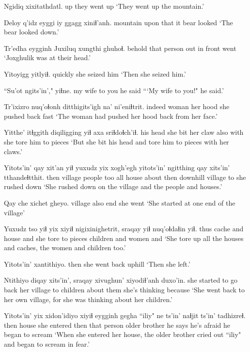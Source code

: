 \documentclass[12pt]{article}
\begin{document}
\gll Ngidiq xixitathdatl.
up  {they went up}
\glt `They went up the mountain.'
\glend 

\gll Deloy  q'idz eyggi iy ggagg  xiniɬ'anh.
mountain upon that it bear  looked
\glt `The bear looked down.'
\glend 

\gll Tr'edha eygginh Juxiluq xungthi ghuhoɬ.
behold  {that person}  {}   {out in front}  went
\glt `Joxghulik was at their head.'
\glend 

\gll Yitoyigg yitlyiɬ.
quickly {she seized him}
\glt `Then she seized him.'
\glend 

\gll ``Su'ot  ngits'in'," yiɬne.
{my wife} {to you} {he said}
\glt ```My wife to you!" he said.'
\glend 

\gll Tr'ixizro nuq'oɬonh ditthigits'igh {na' ni'eniɬtrit.}
indeed woman {her hood}  {she pushed back fast}
\glt `The woman had pushed her hood back from her face.'
\glend 

\gll Yitthe' itɬggith diqiligging yiɬ axa sriɬdoɬch'iɬ.
{his head} {she bit}  {her claw} also with {she tore him to pieces}
\glt `But she bit his head and tore him to pieces with her claws.'
\glend 

\gll Yitots'in' qay xit'an yiɬ yuxudz yix xogh'egh yitots'in' ngitthing qay xits'in' tthandeɬtthit.
then  village people  too all  house about then  downhill village to  {she rushed down}
\glt `She rushed down on the village and the people and houses.'
\glend 

\gll Qay che xichet gheyo.
village also end  {she went}
\glt `She started at one end of the village'
\glend 

\gll Yuxudz tso yiɬ yix xiyiɬ nigixinighetrit, sraqay yiɬ nuq'oɬdaɬin yiɬ.
thus  cache and house and {she tore to pieces} children and women  and
\glt `She tore up all the houses and caches, the women and children too.'
\glend 

\gll Yitots'in' xantithiyo.
then  {she went back uphill}
\glt `Then she left.'
\glend 

\gll Ntithiyo diqay  xits'in', sraqay xivughun' xiyodiɬ'anh duxo'in.
{she started to go back} {her village} to children {about them} {she's thinking} because
\glt `She went back to her own village, for she was thinking about her children.'
\glend 

\gll Yitots'in' yix xidon'idiyo  xiyiɬ eygginh gegha ``iliy" ne ts'in' naɬjit ts'in' tadhizreɬ.
then  house {she entered} then {that person} {older brother} {} {he says} {} {he's afraid} {} {he began to scream}
\glt `When she entered her house, the older brother cried out ``iliy" and began to scream in fear.'
\glend 
\end{document}
